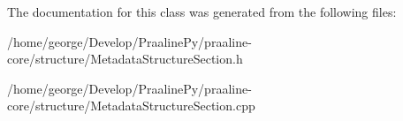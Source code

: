 The documentation for this class was generated from the following files\+:\begin{DoxyCompactItemize}
\item 
/home/george/\+Develop/\+Praaline\+Py/praaline-\/core/structure/Metadata\+Structure\+Section.\+h\item 
/home/george/\+Develop/\+Praaline\+Py/praaline-\/core/structure/Metadata\+Structure\+Section.\+cpp\end{DoxyCompactItemize}
